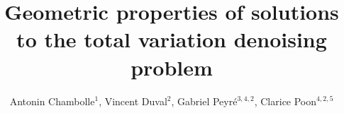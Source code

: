 \documentclass[11pt]{iopart}
\newcommand{\Ceremade}{CEREMADE, Universit\'e Paris-Dauphine, CNRS, Place du Marechal De Lattre De Tassigny, 75775 Paris 16, FRANCE}
\newcommand{\INRIA}{INRIA, MOKAPLAN, 2 rue Simone Iff, Paris, FRANCE}
\newcommand{\CMAP}{CMAP, Ecole Polytechnique, CNRS, 91128 Palaiseau, FRANCE}
\newcommand{\CNRS}{CNRS}
\newcommand{\Cam}{DAMTP, University of Cambridge, Wilberforce Road, Cambridge CB3 0DZ, UK}
\begin{document}
\title[Geometric properties of solutions to the total variation denoising problem]{Geometric properties of solutions \\ to the total variation denoising problem}

\author{Antonin Chambolle$^1$, Vincent Duval$^2$, Gabriel Peyr{\'e}$^{3,4,2}$, Clarice Poon$^{4,2,5}$}

\address{$^1$ \CMAP}
\address{$^2$ \INRIA}
\address{$^3$ \CNRS}
\address{$^4$ \Ceremade}
\address{$^5$ \Cam}




















%
%


\printbibliography

%
%
\end{document}
